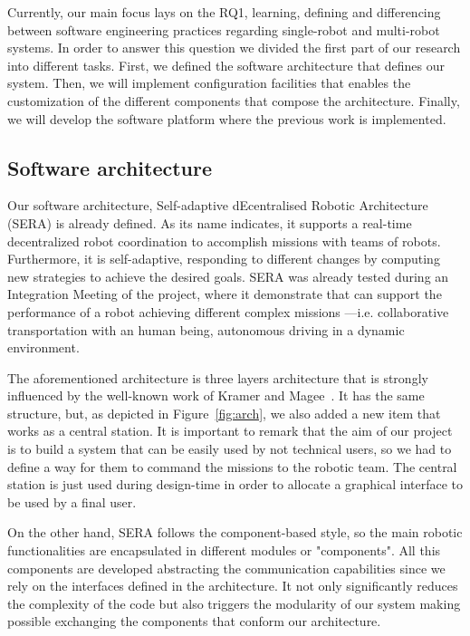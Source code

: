 Currently, our main focus lays on the RQ1, learning, defining and differencing between software engineering practices regarding single-robot and multi-robot systems.
In order to answer this question we divided the first part of our research into different tasks.
First, we defined the software architecture that defines our system.
Then, we will implement configuration facilities that enables the customization of the different components that compose the architecture.
Finally, we will develop the software platform where the previous work is implemented.

\subsection{Software architecture}

Our software architecture, Self-adaptive dEcentralised Robotic Architecture (SERA) is already defined.
As its name indicates, it supports a real-time decentralized robot coordination to accomplish missions with teams of robots. 
Furthermore, it is self-adaptive, responding to different changes by computing new strategies to achieve the desired goals.
SERA was already tested during an Integration Meeting of the project, where it demonstrate that can support the performance of a robot achieving different complex missions ---i.e. collaborative transportation with an human being, autonomous driving in a dynamic environment.

The aforementioned architecture is three layers architecture that is strongly influenced by the well-known work of Kramer and Magee~\cite{kramer}.
It has the same structure, but, as depicted in Figure~\ref{fig:arch}, we also added a new item that works as a central station.
It is important to remark that the aim of our project is to build a system that can be easily used by not technical users, so we had to define a way for them to command the missions to the robotic team.
The central station is just used during design-time in order to allocate a graphical interface to be used by a final user.

On the other hand, SERA follows the component-based style, so the main robotic functionalities are encapsulated in different modules or "components".
All this components are developed abstracting the communication capabilities since we rely on the interfaces defined in the architecture.
It not only significantly reduces the complexity of the code but also triggers the modularity of our system making possible exchanging the components that conform our architecture.

